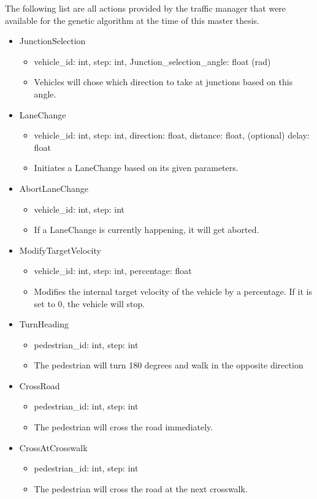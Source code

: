 The following list are all actions provided by the traffic manager that were available for the genetic algorithm at the time of this master thesis.
\begin{itemize}
	\item JunctionSelection
	\begin{itemize}
		\item vehicle\_id: int, step: int, Junction\_selection\_angle: float (rad)
		\item Vehicles will chose which direction to take at junctions based on this angle.
	\end{itemize}
	\item LaneChange
	\begin{itemize}
		\item vehicle\_id: int, step: int, direction: float, distance: float, (optional) delay: float
		\item Initiates a LaneChange based on its given parameters.
	\end{itemize}
	\item AbortLaneChange
	\begin{itemize}
		\item vehicle\_id: int, step: int
		\item If a LaneChange is currently happening, it will get aborted.
	\end{itemize}
	\item ModifyTargetVelocity
	\begin{itemize}
		\item vehicle\_id: int, step: int, percentage: float
		\item Modifies the internal target velocity of the vehicle by a percentage. If it is set to 0, the vehicle will stop.
	\end{itemize}
	\item TurnHeading
	\begin{itemize}
		\item pedestrian\_id: int, step: int
		\item The pedestrian will turn 180 degrees and walk in the opposite direction
	\end{itemize}
	\item CrossRoad
	\begin{itemize}
		\item pedestrian\_id: int, step: int
		\item The pedestrian will cross the road immediately.
	\end{itemize}
	\item CrossAtCrosswalk
	\begin{itemize}
		\item pedestrian\_id: int, step: int
		\item The pedestrian will cross the road at the next crosswalk.
	\end{itemize}
\end{itemize}

